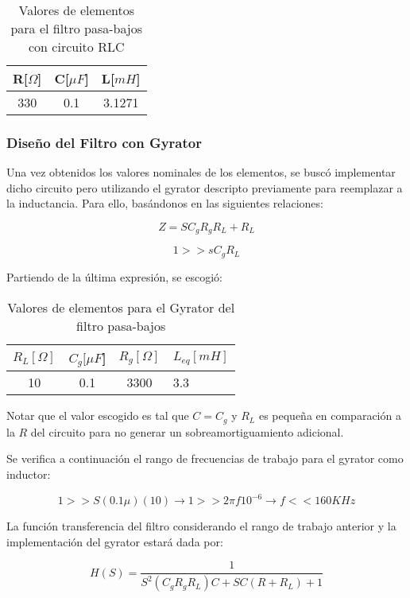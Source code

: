 \begin{table}[H]
    \centering
    \begin{tabular}{|c|c|c|}
    \hline
    \rowcolor[HTML]{C0C0C0} 
    R[$\Omega$] & C[$\mu F$] & L[$mH$]  \\ \hline
    330      & 0.1  & 3.1271 \\ \hline
    \end{tabular}
    \caption{Valores de elementos para el filtro pasa-bajos con circuito RLC}
    \end{table}

\subsubsection{Diseño del Filtro con Gyrator}

Una vez obtenidos los valores nominales de los elementos, se buscó implementar dicho circuito pero utilizando el gyrator descripto previamente
para reemplazar a la inductancia. Para ello, basándonos 
en las siguientes relaciones:

$$Z=SC_gR_gR_L+R_L$$

$$1 >> sC_gR_L$$

Partiendo de la última expresión, se escogió:

\begin{table}[H]
    \centering
    \begin{tabular}{|c|c|c|l|}
    \hline
    \rowcolor[HTML]{C0C0C0} 
    $R_L[\Omega]$ & $C_g[\mu F$] & $R_g[\Omega]$  & $L_{eq}[mH]$ \\ \hline
     10       & 0.1  & 3300 & 3.3        \\ \hline
    \end{tabular}
    \caption{Valores de elementos para el Gyrator del filtro pasa-bajos}
    \end{table}


Notar que el valor escogido es tal que $C=C_g$ y $R_L$ es pequeña en comparación a la $R$ del circuito para no generar
un sobreamortiguamiento adicional.

Se verifica a continuación el rango de frecuencias de trabajo para el gyrator como inductor:

$$1 >> S(0.1 \mu )(10) \longrightarrow 1  >> 2 \pi f 10^{-6} \longrightarrow f << 160 KHz$$

La función transferencia del filtro considerando el rango de trabajo anterior y la implementación del gyrator
estará dada por:

$$H(S)=\frac{1}{S^2(C_gR_gR_L)C+SC(R+R_L)+1}$$

